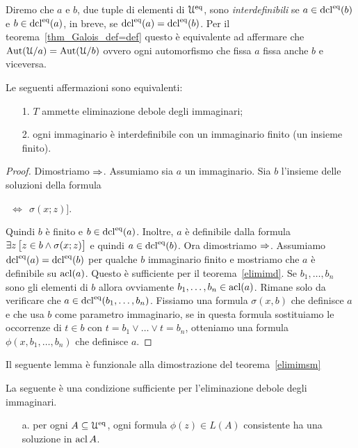 Diremo che $a$ e $b$, due tuple di elementi di $\EuScript U^{\rm eq}$, sono \emph{interdefinibili\/} se $a\in\mathop{\rm dcl}^{\rm eq}(b)$ e $b\in\mathop{\rm dcl}^{\rm eq}(a)$, in breve, se $\mathop{\rm dcl}^{\rm eq}(a)=\mathop{\rm dcl}^{\rm eq}(b)$. Per il teorema~\ref{thm_Galois_def=def} questo \`e equivalente ad affermare che $\textrm{Aut}(\EuScript U/a)=\textrm{Aut}(\EuScript U/b)$ ovvero ogni automorfismo che fissa $a$ fissa anche $b$ e viceversa.

\begin{theorem}\label{elimimd2} 
Le seguenti affermazioni sono equivalenti:
\begin{itemize}
\item[1.] $T$ ammette eliminazione debole degli immaginari;
\item[2.] ogni immaginario \`e interdefinibile con un immaginario finito (un insieme finito).
\end{itemize}
\end{theorem}

\begin{proof}
Dimostriamo $\Rightarrow$. Assumiamo  sia $a$ un immaginario. Sia $b$ l'insieme delle soluzioni della formula

\hspace*{30ex}\llap{$\A x\ \Big[x\in a$}$\ \  \iff\ \  \sigma(x;z)\Big]$.

Quindi $b$ \`e finito e $b\in\mathop{\rm dcl}^{\rm eq}(a)$. Inoltre, $a$ \`e definibile dalla formula $\exists z\,\big[z\in b\wedge \sigma(x;z)\big]$ e quindi $a\in\mathop{\rm dcl}^{\rm eq}(b)$. Ora dimostriamo $\Rightarrow$. Assumiamo $\mathop{\rm dcl}^{\rm eq}(a)=\mathop{\rm dcl}^{\rm eq}(b)$ per qualche $b$ immaginario finito e mostriamo che $a$ \`e definibile su $\mathop{\rm acl}(a)$. Questo \`e sufficiente per il teorema~\ref{elimimd}. Se $b_1,\dots,b_n$ sono gli elementi di $b$ allora ovviamente $b_1,\dots,b_n\in\mathop{\rm acl}(a)$. Rimane solo da verificare che $a\in\mathop{\rm dcl}^{\rm eq}(b_1,\dots,b_n)$. Fissiamo una formula $\sigma(x,b)$ che definisce $a$ e che usa $b$ come parametro immaginario, se in questa formula sostituiamo le occorrenze di $t\in b$ con $t=b_1\vee\dots\vee t=b_n$, otteniamo una formula $\phi(x,b_1,\dots,b_n)$ che definisce $a$.
\end{proof}

Il seguente lemma \`e funzionale alla dimostrazione del teorema~\ref{elimimsm}

\begin{lemma}\label{tvtestimmaginari} 
La seguente \`e una condizione sufficiente per l'eliminazione debole degli immaginari.
\begin{itemize}
\item[a.] per ogni $A\subseteq\EuScript U^{\rm eq}$, ogni formula $\phi(z)\in L(A)$ consistente ha una soluzione in $\mathop{\rm acl} A$.
\end{itemize}
\end{lemma}

